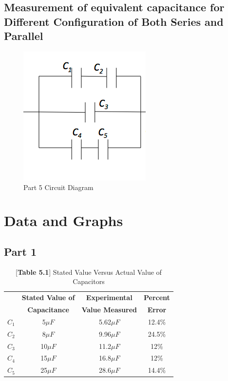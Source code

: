 \documentclass[titlepage]{article}
\begin{document}
        \subsection{Measurement of equivalent capacitance for Different Configuration of Both Series and Parallel}

        \begin{figure}[hbt!] 
            \centering
            \caption*{Part 5 Circuit Diagram}
            \includegraphics[scale=0.5]{images/procedure/part5.png}
        \end{figure} 
        



	\section{Data and Graphs}
	    \subsection{Part 1}
        \FloatBarrier
		\begin{table}[hbt!]
			\centering
			\caption*{[\textbf{Table 5.1}] Stated Value Versus Actual Value of Capacitors}
			\begin{tabular}{c|c|c|c}
				&\textbf{Stated Value of} &\textbf{Experimental} &\textbf{Percent}\\
				& \textbf{Capacitance} & \textbf{Value Measured} & \textbf{Error}\\
				\hline
			$C_1$ & 5$\mu F$ & 5.62$\mu F$ & 12.4\% \\ 
			$C_2$ & 8$\mu F$ & 9.96$\mu F$ & 24.5\% \\ 
			$C_3$ & 10$\mu F$ & 11.2$\mu F$ & 12\% \\ 
			$C_4$ & 15$\mu F$ & 16.8$\mu F$ & 12\% \\ 
			$C_5$ & 25$\mu F$ & 28.6$\mu F$ & 14.4\% \\ 
			\end{tabular}
		\end{table}
        \FloatBarrier
\end{document}
